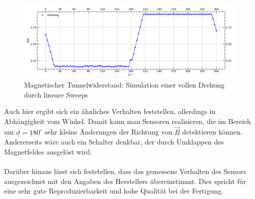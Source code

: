 \documentclass[german,  %
parskip=full,  %
]{scrartcl}
\begin{document}
\begin{figure}[h!]\centering
\includegraphics[width=\textwidth]{Probe4_Drehung.png}
\caption{Magnetischer Tunnelwiderstand: Simulation einer vollen Drehung durch lineare Sweeps}
\end{figure} 
Auch hier ergibt sich ein ähnliches Verhalten feststellen, allerdings in Abhängigkeit vom Winkel. Damit kann man Sensoren realisieren, die im Bereich um \(\vartheta=180^{\circ}\) sehr kleine Änderungen der Richtung von \(\vec{B}\) detektieren können. Andererseits wäre auch ein Schalter denkbar, der durch Umklappen des Magnetfeldes ausgelöst wird. \\\\
Darüber hinaus lässt sich feststellen, dass das gemessene Verhalten des Sensors ausgezeichnet mit den Angaben des Herstellers übereinstimmt. Dies spricht für eine sehr gute Reproduzierbarkeit und hohe Qualität bei der Fertigung.
\end{document}
